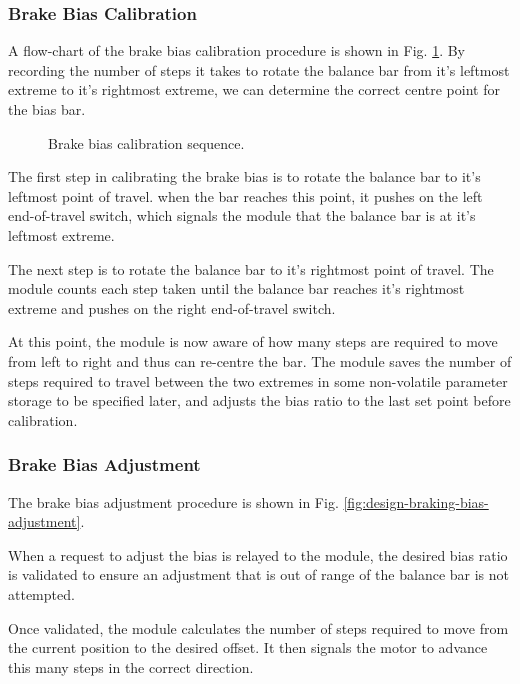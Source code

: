 \subsubsection{Brake Bias Calibration}

A flow-chart of the brake bias calibration procedure is shown in Fig. \ref{fig:brake_bias_calibration_flow}. By recording the number of steps it takes to rotate the balance bar from it's leftmost extreme to it's rightmost extreme, we can determine the correct centre point for the bias bar. 

\begin{figure}[H]
\centering

\caption{Brake bias calibration sequence.}
\label{fig:brake_bias_calibration_flow}
\end{figure}

The first step in calibrating the brake bias is to rotate the balance bar to it's leftmost point of travel. when the bar reaches this point, it pushes on the left end-of-travel switch, which signals the module that the balance bar is at it's leftmost extreme. 

The next step is to rotate the balance bar to it's rightmost point of travel. The module counts each step taken until the balance bar reaches it's rightmost extreme and pushes on the right end-of-travel switch.

At this point, the module is now aware of how many steps are required to move from left to right and thus can re-centre the bar. The module saves the number of steps required to travel between the two extremes in some non-volatile parameter storage to be specified later, and adjusts the bias ratio to the last set point before calibration.

\subsubsection{Brake Bias Adjustment}

The brake bias adjustment procedure is shown in Fig. \ref{fig:design-braking-bias-adjustment}. 

When a request to adjust the bias is relayed to the module, the desired bias ratio is validated to ensure an adjustment that is out of range of the balance bar is not attempted. 

Once validated, the module calculates the number of steps required to move from the current position to the desired offset. It then signals the motor to advance this many steps in the correct direction.

